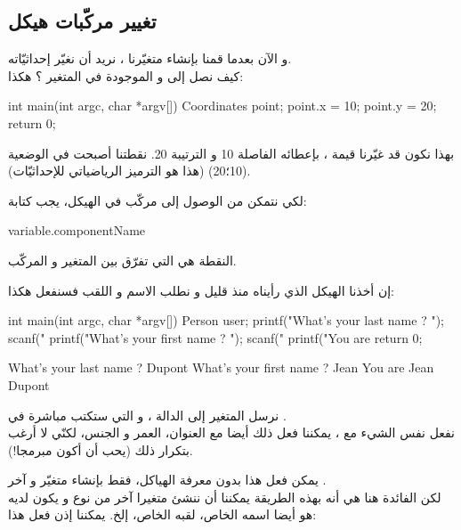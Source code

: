 \subsection{تغيير مركّبات هيكل}

و الآن بعدما قمنا بإنشاء متغيّرنا
،
نريد أن نغيّر إحداثيّاته.\\
كيف نصل إلى
و
الموجودة في المتغير
؟ هكذا:

\begin{Csource}
int main(int argc, char *argv[])
{
	Coordinates point;
	point.x = 10;
	point.y = 20;
	return 0;
}
\end{Csource}

بهذا نكون قد غيّرنا قيمة
،
بإعطائه الفاصلة 10 و الترتيبة 20. نقطتنا أصبحت في الوضعية (10؛20) (هذا هو الترميز الرياضياتي للإحداثيّات).

لكي نتمكن من الوصول إلى مركّب في الهيكل، يجب كتابة:

\begin{Csource}
  variable.componentName
\end{Csource}

النقطة هي التي تفرّق بين المتغير و المركّب.

إن أخذنا الهيكل
الذي رأيناه منذ قليل و نطلب الاسم و اللقب فسنفعل هكذا:

\begin{Csource}
int main(int argc, char *argv[])
{
	Person user;
	printf("What's your last name ? ");
	scanf("%
	printf("What's your first name ? ");
	scanf("%
	printf("You are %
	return 0;
}
\end{Csource}

\begin{Console}
What's your last name ? Dupont
What's your first name ? Jean
You are Jean Dupont
\end{Console}

نرسل المتغير
إلى الدالة
،
و التي ستكتب مباشرة في
.\\
نفعل نفس الشيء مع
،
يمكننا فعل ذلك أيضا مع العنوان، العمر و الجنس، لكنّي لا أرغب بتكرار ذلك (يحب أن أكون مبرمجا!).

يمكن فعل هذا بدون معرفة الهياكل، فقط بإنشاء متغيّر
و آخر
.\\
لكن الفائدة هنا هي أنه بهذه الطريقة يمكننا أن ننشئ متغيرا آخر من نوع
و يكون لديه هو أيضا اسمه الخاص، لقبه الخاص، إلخ. يمكننا إذن فعل هذا:

